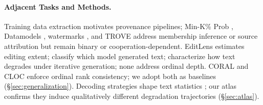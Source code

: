 \paragraph{Adjacent Tasks and Methods.}
Training data extraction \cite{carlini2021_extracting} motivates provenance pipelines; Min-K\% Prob \cite{shi2024_minkprob}, Datamodels \cite{ilyas2022datamodels}, watermarks \cite{christ2024_undetectable}, and TROVE \cite{zhu2025_trove} address membership inference or source attribution but remain binary or cooperation-dependent.
EditLens \cite{editlens2026} estimates editing extent; \citet{uchendu2020_attribution} classify which model generated text; \citet{mohamed2025_broken_telephone} characterize how text degrades under iterative generation; none address ordinal depth.
CORAL \cite{coral2020} and CLOC \cite{cloc2025} enforce ordinal rank consistency; we adopt both as baselines (\S\ref{sec:generalization}).
Decoding strategies shape text statistics \cite{holtzman2020_nucleus,finlayson2024_closing,garces_arias2025_decoding_decoded,wiher2022_decoding,basu2021_mirostat}; our atlas confirms they induce qualitatively different degradation trajectories (\S\ref{sec:atlas}).